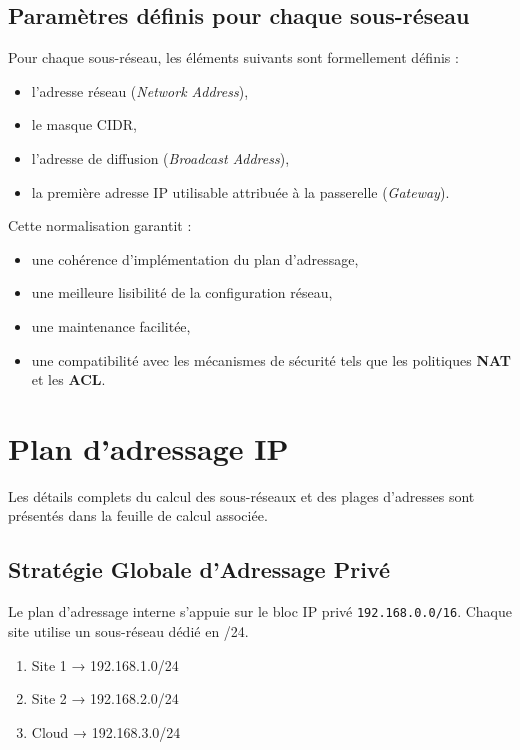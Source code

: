 \documentclass[12pt,a4paper, oneside]{memoir}
\begin{document}
\subsection{Paramètres définis pour chaque sous-réseau}

Pour chaque sous-réseau, les éléments suivants sont formellement définis :

\begin{itemize}
	\item l’adresse réseau (\textit{Network Address}),
	\item le masque CIDR,
	\item l’adresse de diffusion (\textit{Broadcast Address}),
	\item la première adresse IP utilisable attribuée à la passerelle (\textit{Gateway}).
\end{itemize}

Cette normalisation garantit :

\begin{itemize}
	\item une cohérence d’implémentation du plan d’adressage,
	\item une meilleure lisibilité de la configuration réseau,
	\item une maintenance facilitée,
	\item une compatibilité avec les mécanismes de sécurité tels que les politiques \textbf{NAT} et les \textbf{ACL}.
\end{itemize}


\section{Plan d’adressage IP}
Les détails complets du calcul des sous-réseaux et des plages d’adresses sont présentés dans la feuille de calcul associée.

\subsection{Stratégie Globale d’Adressage Privé}
Le plan d’adressage interne s’appuie sur le bloc IP privé \texttt{192.168.0.0/16}. 
Chaque site utilise un sous-réseau dédié en /24.\\
\begin{enumerate}
	\item Site 1 → 192.168.1.0/24	
	\item Site 2 → 192.168.2.0/24	
	\item Cloud → 192.168.3.0/24
\end{enumerate}
\end{document}

